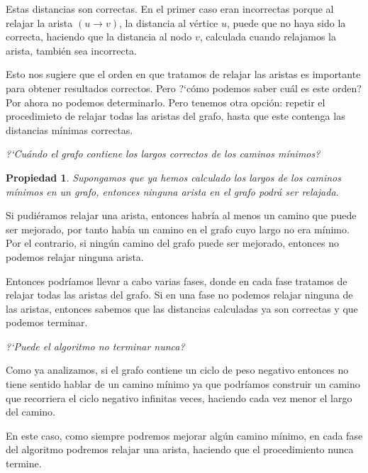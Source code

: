 \documentclass[a4paper, 10pt]{article}
\numberwithin{theoremCounter}{subsection}
\numberwithin{problemCounter}{subsection}
\numberwithin{defCounter}{subsection}
\numberwithin{obsCounter}{subsection}
\numberwithin{methCounter}{subsection}
\numberwithin{exampleCounter}{subsection}
\newcounter{propCounter}
\numberwithin{propCounter}{subsection}
\theoremstyle{violetnumbox}
\theoremstyle{blacknumex}
\newtheorem{propertyT}[propCounter]{Propiedad}
\newenvironment{property}{\begin{dBox}\begin{propertyT}}{\end{propertyT}\end{dBox}}
\begin{document}
\begin{multicols}{2}
    Estas distancias son correctas. En el primer caso eran incorrectas porque al relajar la arista $(u\rightarrow v)$, la distancia al v\'ertice $u$, puede que no haya sido la correcta, haciendo que la distancia al nodo $v$, calculada cuando relajamos la arista, tambi\'en sea incorrecta.

    Esto nos sugiere que el orden en que tratamos de relajar las aristas es importante para obtener resultados correctos. Pero ?`c\'omo podemos saber cu\'al es este orden? Por ahora no podemos determinarlo. Pero tenemos otra opci\'on: repetir el procedimieto de relajar todas las aristas del grafo, hasta que este contenga las distancias m\'inimas correctas. \newline

    \noindent\textit{?`Cu\'ando el grafo contiene los largos correctos de los caminos m\'inimos?}\newline

    \begin{property}
        Supongamos que ya hemos calculado los largos de los caminos m\'inimos en un grafo, entonces ninguna arista en el grafo podr\'a ser relajada.
    \end{property}

    Si pudi\'eramos relajar una arista, entonces habr\'ia al menos un camino que puede ser mejorado, por tanto hab\'ia un camino en el grafo cuyo largo no era m\'inimo. Por el contrario, si ning\'un camino del grafo puede ser mejorado, entonces no podemos relajar ninguna arista.

    Entonces podr\'iamos llevar a cabo varias fases, donde en cada fase tratamos de relajar todas las aristas del grafo. Si en una fase no podemos relajar ninguna de las aristas, entonces sabemos que las distancias calculadas ya son correctas y que podemos terminar. \newline

    \noindent\textit{?`Puede el algoritmo no terminar nunca?}\newline

    Como ya analizamos, si el grafo contiene un ciclo de peso negativo entonces no tiene sentido hablar de un camino m\'inimo ya que podr\'iamos construir un camino que recorriera el ciclo negativo infinitas veces, haciendo cada vez menor el largo del camino.

    En este caso, como siempre podremos mejorar alg\'un camino m\'inimo, en cada fase del algoritmo podremos relajar una arista, haciendo que el procedimiento nunca termine.


\end{multicols}
\end{document}
